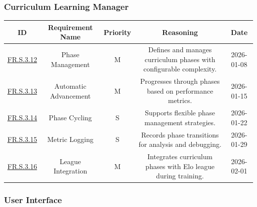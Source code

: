 \documentclass{article}
\begin{document}
\vspace{1em}

\subsubsection*{Curriculum Learning Manager}

\begin{tabular}{|c|c|c|c|c|}
\hline
\textbf{ID} & \textbf{Requirement Name} & \textbf{Priority} &
\textbf{Reasoning} & \textbf{Date} \\
\hline
\hyperref[FR.S.3.12]{FR.S.3.12} & Phase Management & M &
\parbox[t]{4cm}{Defines and manages curriculum phases with configurable complexity.} &
2026-01-08 \\
\hline
\hyperref[FR.S.3.13]{FR.S.3.13} & Automatic Advancement & M &
\parbox[t]{4cm}{Progresses through phases based on performance metrics.} &
2026-01-15 \\
\hline
\hyperref[FR.S.3.14]{FR.S.3.14} & Phase Cycling & S &
\parbox[t]{4cm}{Supports flexible phase management strategies.} &
2026-01-22 \\
\hline
\hyperref[FR.S.3.15]{FR.S.3.15} & Metric Logging & S &
\parbox[t]{4cm}{Records phase transitions for analysis and debugging.} &
2026-01-29 \\
\hline
\hyperref[FR.S.3.16]{FR.S.3.16} & League Integration & M &
\parbox[t]{4cm}{Integrates curriculum phases with Elo league during training.} &
2026-02-01 \\
\hline
\end{tabular}

\vspace{1em}

\subsubsection*{User Interface}
\end{document}
